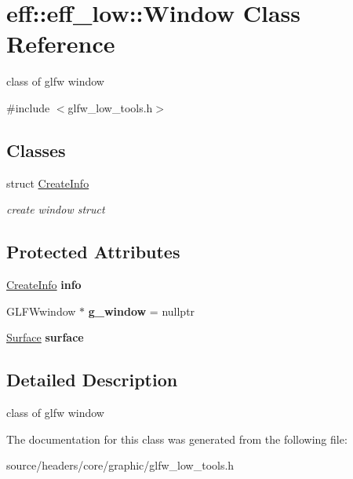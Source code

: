 \hypertarget{classeff_1_1eff__low_1_1Window}{}\section{eff\+:\+:eff\+\_\+low\+:\+:Window Class Reference}
\label{classeff_1_1eff__low_1_1Window}


class of glfw window  




{\ttfamily \#include $<$glfw\+\_\+low\+\_\+tools.\+h$>$}

\subsection*{Classes}
\begin{DoxyCompactItemize}
\item 
struct \mbox{\hyperlink{structeff_1_1eff__low_1_1Window_1_1CreateInfo}{Create\+Info}}
\begin{DoxyCompactList}\small\item\em create window struct \end{DoxyCompactList}\end{DoxyCompactItemize}
\subsection*{Protected Attributes}
\begin{DoxyCompactItemize}
\item 
\mbox{\label{classeff_1_1eff__low_1_1Window_af8d42e109a9448e4e4c4719d489a048c}} 
\mbox{\hyperlink{structeff_1_1eff__low_1_1Window_1_1CreateInfo}{Create\+Info}} {\bfseries info}
\item 
\mbox{\label{classeff_1_1eff__low_1_1Window_ababf20192a2c5fc9c60f8bea2dd38241}} 
G\+L\+F\+Wwindow $\ast$ {\bfseries g\+\_\+window} = nullptr
\item 
\mbox{\label{classeff_1_1eff__low_1_1Window_a26e364e5170ea28a2d0e6ddb7e89f55b}} 
\mbox{\hyperlink{classeff_1_1eff__low_1_1Surface}{Surface}} {\bfseries surface}
\end{DoxyCompactItemize}


\subsection{Detailed Description}
class of glfw window 

The documentation for this class was generated from the following file\+:\begin{DoxyCompactItemize}
\item 
source/headers/core/graphic/glfw\+\_\+low\+\_\+tools.\+h\end{DoxyCompactItemize}
